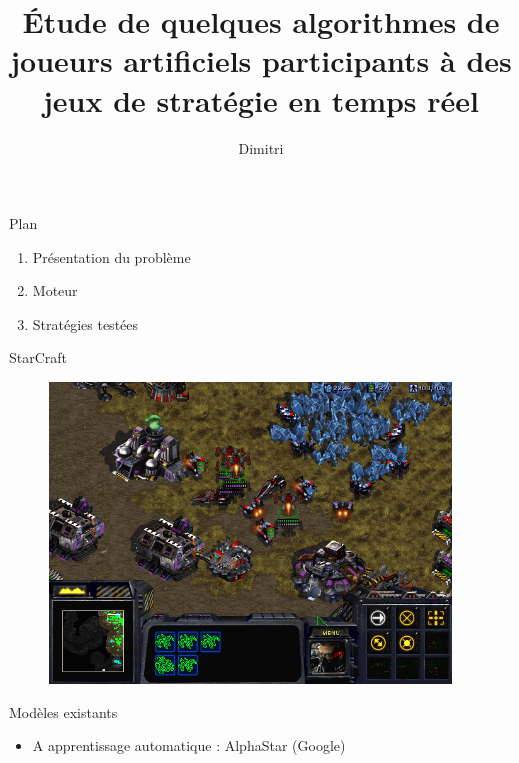 \documentclass[french]{beamer}
\title{Étude de quelques algorithmes de joueurs artificiels participants à des jeux de stratégie en temps réel}
\author{Dimitri \bsc{Cocheril-Crèvecœur}}
\begin{document}
\begin{frame}[plain]
    \maketitle
\end{frame}
\begin{frame}{Plan}
	\begin{enumerate}
		\item Présentation du problème
		\item Moteur
		\item Stratégies testées
	\end{enumerate}
\end{frame}
\begin{frame}{StarCraft}
	\begin{figure}
		\centering
		\begin{minipage}{0.49\textwidth}
			\centering
			\includegraphics[width=0.95\textwidth]{screen_starcraft.png}
		\end{minipage}\hfill
		\begin{minipage}{0.49\textwidth}
			
		\end{minipage}
	\end{figure}
\end{frame}
\begin{frame}{Modèles existants}
	\begin{itemize}
		\item A apprentissage automatique : AlphaStar (Google)
	\end{itemize}
\end{frame}
\end{document}
